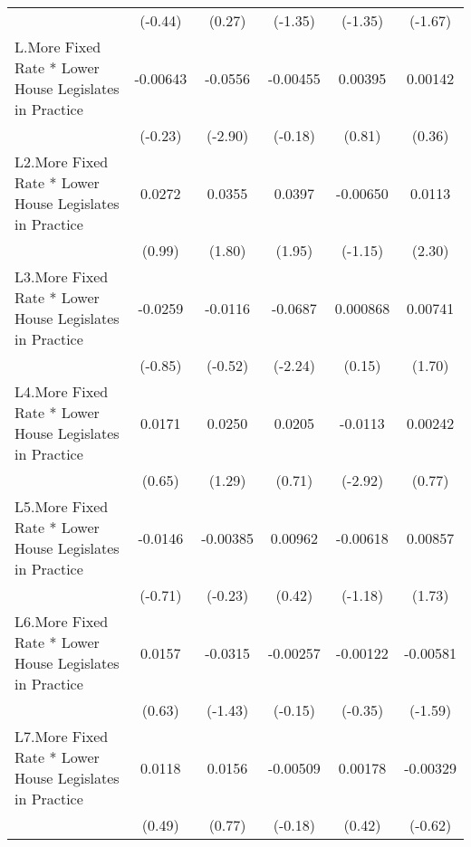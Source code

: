 {\begin{tabular}{l*{5}{c}}
                &  (-0.44)         &   (0.27)         &  (-1.35)         &  (-1.35)         &  (-1.67)         \\
[1em]
L.More Fixed Rate * Lower House Legislates in Practice& -0.00643         &  -0.0556\sym{**} & -0.00455         &  0.00395         &  0.00142         \\
                &  (-0.23)         &  (-2.90)         &  (-0.18)         &   (0.81)         &   (0.36)         \\
[1em]
L2.More Fixed Rate * Lower House Legislates in Practice&   0.0272         &   0.0355         &   0.0397         & -0.00650         &   0.0113\sym{*}  \\
                &   (0.99)         &   (1.80)         &   (1.95)         &  (-1.15)         &   (2.30)         \\
[1em]
L3.More Fixed Rate * Lower House Legislates in Practice&  -0.0259         &  -0.0116         &  -0.0687\sym{*}  & 0.000868         &  0.00741         \\
                &  (-0.85)         &  (-0.52)         &  (-2.24)         &   (0.15)         &   (1.70)         \\
[1em]
L4.More Fixed Rate * Lower House Legislates in Practice&   0.0171         &   0.0250         &   0.0205         &  -0.0113\sym{**} &  0.00242         \\
                &   (0.65)         &   (1.29)         &   (0.71)         &  (-2.92)         &   (0.77)         \\
[1em]
L5.More Fixed Rate * Lower House Legislates in Practice&  -0.0146         & -0.00385         &  0.00962         & -0.00618         &  0.00857         \\
                &  (-0.71)         &  (-0.23)         &   (0.42)         &  (-1.18)         &   (1.73)         \\
[1em]
L6.More Fixed Rate * Lower House Legislates in Practice&   0.0157         &  -0.0315         & -0.00257         & -0.00122         & -0.00581         \\
                &   (0.63)         &  (-1.43)         &  (-0.15)         &  (-0.35)         &  (-1.59)         \\
[1em]
L7.More Fixed Rate * Lower House Legislates in Practice&   0.0118         &   0.0156         & -0.00509         &  0.00178         & -0.00329         \\
                &   (0.49)         &   (0.77)         &  (-0.18)         &   (0.42)         &  (-0.62)         \\

\end{tabular}}
